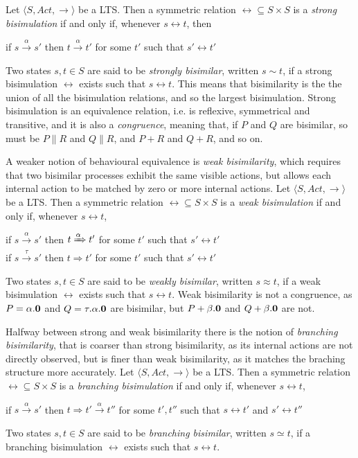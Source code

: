 Let $\langle S , Act, \rightarrow \rangle$ be a LTS. Then a symmetric relation $\rel \subseteq S \times S$ is a \textit{strong bisimulation} if and only if, whenever $s \rel t$, then 
\begin{center}
if $s \xrightarrow{\alpha} s'$ then $t \xrightarrow{\alpha} t'$ for some $t'$ such that $s' \rel t'$
\end{center}
Two states $s, t \in S$ are said to be \textit{strongly bisimilar}, written $s \sim t$, if a strong bisimulation $\rel$ exists such that $s \rel t$. This means that bisimilarity is the the union of all the bisimulation relations, and so the largest bisimulation. 
Strong bisimulation is an equivalence relation, i.e. is reflexive, symmetrical and transitive, and it is also a \textit{congruence}, meaning that, if $P$ and $Q$ are bisimilar, so must be $P\parallel R$ and $Q\parallel R$, and $P + R$ and $Q + R$, and so on.



A weaker notion of behavioural equivalence is \textit{weak bisimilarity}, which requires that two bisimilar processes exhibit the same visible actions, but allows each internal action to be matched by zero or more internal actions.
Let $\langle S , Act, \rightarrow \rangle$ be a LTS. Then a symmetric relation $\rel \subseteq S \times S$ is a \textit{weak bisimulation} if and only if, whenever $s \rel t$,
\begin{center}
if $s \xrightarrow{\alpha} s'$ then $t \xRightarrow{\alpha} t'$ for some $t'$ such that $s' \rel t'$ \\
if $s \xrightarrow{\tau} s'$ then $t \Rightarrow t'$ for some $t'$ such that $s' \rel t'$ 
\end{center}
Two states $s, t \in S$ are said to be \textit{weakly bisimilar}, written $s \approx t$, if a weak bisimulation $\rel$ exists such that $s \rel t$.  Weak bisimilarity is not a congruence, as $P = \alpha.\mathbf{0}$ and $Q = \tau.\alpha.\mathbf{0}$ are bisimilar, but $P + \beta.\mathbf{0}$ and $Q + \beta.\mathbf{0}$ are not.


Halfway between strong and weak bisimilarity there is the notion of \textit{branching bisimilarity}, that is coarser than strong bisimilarity, as its internal actions are not directly observed, but is finer than weak bisimilarity, as it matches the braching structure more accurately.
Let $\langle S , Act, \rightarrow \rangle$ be a LTS. Then a symmetric relation $\rel \subseteq S \times S$ is a \textit{branching bisimulation} if and only if, whenever $s \rel t$, 
\begin{center}
if $s \xrightarrow{\alpha} s'$ then $t \Rightarrow t' \xrightarrow{\alpha} t''$ for some $t', t''$ such that $s \rel t'$ and $s' \rel t''$
\end{center}
Two states $s, t \in S$ are said to be \textit{branching bisimilar}, written $s \simeq t$, if a branching bisimulation $\rel$ exists such that $s \rel t$.


